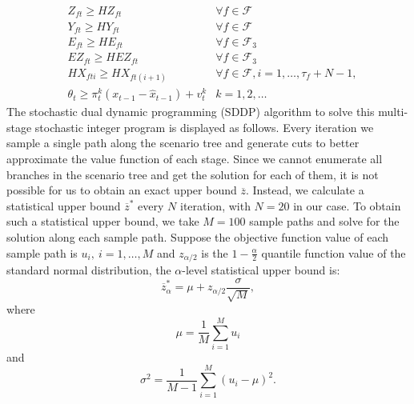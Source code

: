 \documentclass[12pt]{article}
\begin{document}
\begin{subequations}
\begin{align}
			& Z_{ft} \geq HZ_{ft} & \forall f \in \mathcal{F} \label{cons:transZtlr}\\
			& Y_{ft} \geq HY_{ft} & \forall f \in \mathcal{F} \label{cons:transYtlr}\\
			& E_{ft} \geq HE_{ft} & \forall f \in \mathcal{F}_3 \label{cons:transEtlr}\\
			& EZ_{ft} \geq HEZ_{ft} & \forall f \in \mathcal{F}_3 \label{cons:transEZtlr}\\
			& HX_{fti} \geq HX_{ft(i+1)} & \forall f \in \mathcal{F}, i = 1, \dots, \tau_{f} + N -1, \label{cons:transHXtlr}\\
			& \theta_t \geq \pi_t^k(x_{t-1} - \hat{x}_{t-1}) + v_t^k & k = 1, 2, \dots \label{cons:cutslr}
		\end{align}
	\end{subequations}
	\newline
	The stochastic dual dynamic programming (SDDP) algorithm to solve this multi-stage stochastic integer program is displayed as follows. Every iteration we sample a single path along the scenario tree and generate cuts to better approximate the value function of each stage. Since we cannot enumerate all branches in the scenario tree and get the solution for each of them, it is not possible for us to obtain an exact upper bound \(\overline{z}\). Instead, we calculate a statistical upper bound \(\overline{z}^*\) every \(N\) iteration, with \(N = 20\) in our case. To obtain such a statistical upper bound, we take \(M = 100\) sample paths and solve for the solution along each sample path. Suppose the objective function value of each sample path is \(u_i,\ i = 1, \dots, M\) and \(z_{\alpha/2}\) is the \(1 - \frac{\alpha}{2}\) quantile function value of the standard normal distribution, the \(\alpha\)-level statistical upper bound is:
	\begin{equation}
		\overline{z}^*_\alpha = \mu + z_{\alpha/2} \frac{\sigma}{\sqrt{M}},
	\end{equation}
	where 
	\[\mu = \frac{1}{M}\sum_{i = 1}^{M} u_i \]
	and
	\[\sigma^2 = \frac{1}{M-1}\sum_{i = 1}^{M} (u_i - \mu)^2.\]
\end{document}
